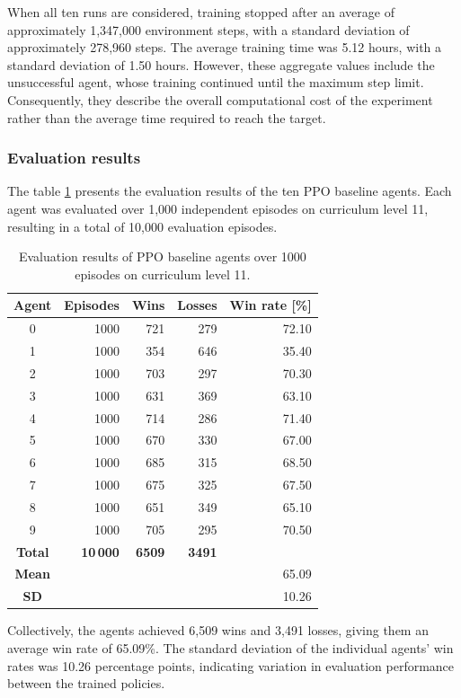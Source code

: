 When all ten runs are considered, training stopped after an average of approximately 1,347,000 environment steps, with a standard deviation of approximately 278,960 steps. The average training time was 5.12 hours, with a standard deviation of 1.50 hours. However, these aggregate values include the unsuccessful agent, whose training continued until the maximum step limit. Consequently, they describe the overall computational cost of the experiment rather than the average time required to reach the target.

\subsubsection{Evaluation results}
The table \ref{tab:baseline_evaluation_results} presents the evaluation results of the ten PPO baseline agents. Each agent was evaluated over 1,000 independent episodes on curriculum level 11, resulting in a total of 10,000 evaluation episodes.
\begin{table}[H]
	\centering
	\caption{Evaluation results of PPO baseline agents over 1000 episodes on curriculum level 11.}
	\label{tab:baseline_evaluation_results}
	\begin{tabular}{c r r r r}
		\toprule
		\textbf{Agent} &
		\textbf{Episodes} &
		\textbf{Wins} &
		\textbf{Losses} &
		\textbf{Win rate [\%]} \\
		\midrule
		0 & 1000 & 721 & 279 & 72.10 \\
		1 & 1000 & 354 & 646 & 35.40 \\
		2 & 1000 & 703 & 297 & 70.30 \\
		3 & 1000 & 631 & 369 & 63.10 \\
		4 & 1000 & 714 & 286 & 71.40 \\
		5 & 1000 & 670 & 330 & 67.00 \\
		6 & 1000 & 685 & 315 & 68.50 \\
		7 & 1000 & 675 & 325 & 67.50 \\
		8 & 1000 & 651 & 349 & 65.10 \\
		9 & 1000 & 705 & 295 & 70.50 \\
		\midrule
		\textbf{Total} &
		\textbf{10\,000} &
		\textbf{6509} &
		\textbf{3491} &
		\textbf{} \\
		\textbf{Mean} &
		 &
		 &
		 &
		65.09 \\
		\textbf{SD} &
		 &
		 &
		 &
		10.26 \\
		\bottomrule
	\end{tabular}
\end{table}
Collectively, the agents achieved 6,509 wins and 3,491 losses, giving them an average win rate of 65.09\%. The standard deviation of the individual agents' win rates was 10.26 percentage points, indicating variation in evaluation performance between the trained policies.

